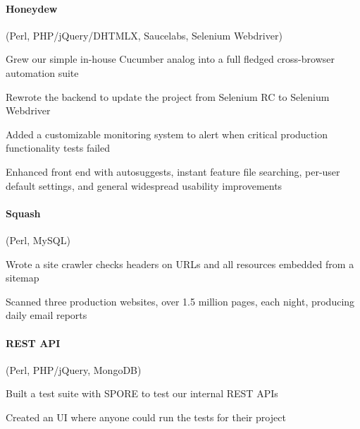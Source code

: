 \begin{position}
%
  \paragraph{Honeydew} (Perl, PHP/jQuery/DHTMLX, Saucelabs, Selenium Webdriver)
  \begin{myitem}
  \item Grew our simple in-house Cucumber analog into a full fledged cross-browser automation suite
  \item Rewrote the backend to update the project from Selenium RC to Selenium Webdriver
  \item Added a customizable monitoring system to alert when critical production functionality tests failed
  \item Enhanced front end with autosuggests, instant feature file searching, per-user default
    settings, and general widespread usability improvements
  \end{myitem}
%
%
  \paragraph{Squash} (Perl, MySQL)
  \begin{myitem}
  \item Wrote a site crawler checks headers on URLs and all resources embedded from a sitemap
  \item Scanned three production websites, over 1.5 million pages,
    each night, producing daily email reports
  \end{myitem}
%
  \paragraph{REST API} (Perl, PHP/jQuery, MongoDB)
  \begin{myitem}
  \item Built a test suite with SPORE to test our internal REST APIs
  \item Created an UI where anyone could run the tests for their project
  \end{myitem}
%

\end{position}
